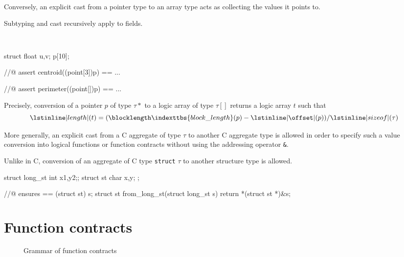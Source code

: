 Conversely, an explicit cast from a pointer type to an array type
acts as collecting the values it points to.

Subtyping and cast recursively apply to fields.

\begin{example}
~
\begin{listing-nonumber}
  struct { float u,v; } p[10];

  //@ assert centroid((point[3])p) == ...

  //@ assert perimeter((point[])p) == ...
\end{listing-nonumber}
\end{example}

Precisely, conversion of a pointer $p$ of type $\tau*$ to a logic array of type
$\tau[]$ returns a logic array $t$ such that
\[
\lstinline|length|(t) = (
\blocklength\indexttbs{block\_length}
(p) -
\lstinline|\offset|
(p))/\lstinline|sizeof|(\tau)
\]

More generally, an explicit cast from a C aggregate of type $\tau$ to another C
aggregate type is allowed in order to specify such a value conversion into logical functions or function contracts without using the addressing operator \lstinline|&|.

\begin{example}
Unlike in C, conversion of an aggregate of C type \lstinline|struct| $\tau$  to another structure type is allowed.

\begin{listing-nonumber}
  struct long_st { int x1,y2;};
  struct st { char x,y; };

  //@ ensures \result == (struct st) s;
  struct st from_long_st(struct long_st s) {
     return *(struct st *)&s;
  }
\end{listing-nonumber}
\end{example}


\section{Function contracts}
\label{sec:fn-behavior}

\begin{figure}[htp]
  \begin{cadre}
      
   \end{cadre}
    \caption{Grammar of function contracts}
  \label{fig:gram:contracts}
\end{figure}

